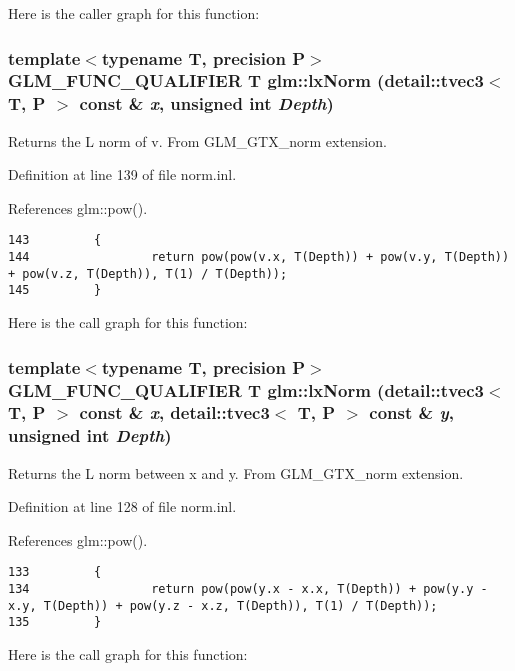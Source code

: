 Here is the caller graph for this function:\hypertarget{group__gtx__norm_g955869c61ab902e4e3cf061303efdaef}{
\subsubsection[lxNorm]{\setlength{\rightskip}{0pt plus 5cm}template$<$typename T, precision P$>$ GLM\_\-FUNC\_\-QUALIFIER T glm::lxNorm (detail::tvec3$<$ T, P $>$ const \& {\em x}, \/  unsigned int {\em Depth})}}
\label{group__gtx__norm_g955869c61ab902e4e3cf061303efdaef}


Returns the L norm of v. From GLM\_\-GTX\_\-norm extension. 

Definition at line 139 of file norm.inl.

References glm::pow().

\begin{Code}\begin{verbatim}143         {
144                 return pow(pow(v.x, T(Depth)) + pow(v.y, T(Depth)) + pow(v.z, T(Depth)), T(1) / T(Depth));
145         }
\end{verbatim}
\end{Code}




Here is the call graph for this function:\hypertarget{group__gtx__norm_g2f42190c8743abab279d0a8f5a321692}{
\subsubsection[lxNorm]{\setlength{\rightskip}{0pt plus 5cm}template$<$typename T, precision P$>$ GLM\_\-FUNC\_\-QUALIFIER T glm::lxNorm (detail::tvec3$<$ T, P $>$ const \& {\em x}, \/  detail::tvec3$<$ T, P $>$ const \& {\em y}, \/  unsigned int {\em Depth})}}
\label{group__gtx__norm_g2f42190c8743abab279d0a8f5a321692}


Returns the L norm between x and y. From GLM\_\-GTX\_\-norm extension. 

Definition at line 128 of file norm.inl.

References glm::pow().

\begin{Code}\begin{verbatim}133         {
134                 return pow(pow(y.x - x.x, T(Depth)) + pow(y.y - x.y, T(Depth)) + pow(y.z - x.z, T(Depth)), T(1) / T(Depth));
135         }
\end{verbatim}
\end{Code}




Here is the call graph for this function: